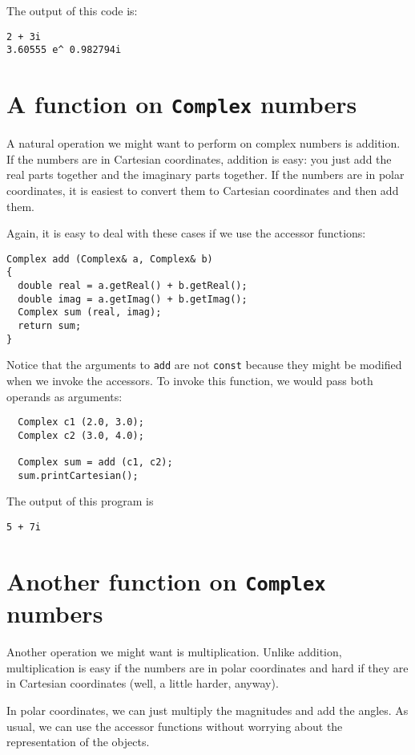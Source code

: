 The output of this code is:

\begin{verbatim}
2 + 3i
3.60555 e^ 0.982794i
\end{verbatim}

\section{A function on {\tt Complex} numbers}

A natural operation we might want to perform on complex numbers is
addition.  If the numbers are in Cartesian coordinates, addition is
easy: you just add the real parts together and the imaginary parts
together.  If the numbers are in polar coordinates, it is easiest to
convert them to Cartesian coordinates and then add them.

Again, it is easy to deal with these cases if we use
the accessor functions:

\begin{verbatim}
Complex add (Complex& a, Complex& b)
{
  double real = a.getReal() + b.getReal();
  double imag = a.getImag() + b.getImag();
  Complex sum (real, imag);
  return sum;
}
\end{verbatim}
%
Notice that the arguments to {\tt add} are not {\tt const}
because they might be modified when we invoke the accessors.
To invoke this function, we would pass both operands as arguments:

\begin{verbatim}
  Complex c1 (2.0, 3.0);
  Complex c2 (3.0, 4.0);

  Complex sum = add (c1, c2);
  sum.printCartesian();
\end{verbatim}
%
The output of this program is

\begin{verbatim}
5 + 7i
\end{verbatim}
%


\section{Another function on {\tt Complex} numbers}

Another operation we might want is multiplication.  Unlike
addition, multiplication is easy if the numbers are in polar
coordinates and hard if they are in Cartesian coordinates
(well, a little harder, anyway).

In polar coordinates, we can just multiply the magnitudes and
add the angles.  As usual, we can use the accessor functions
without worrying about the representation of the objects.

